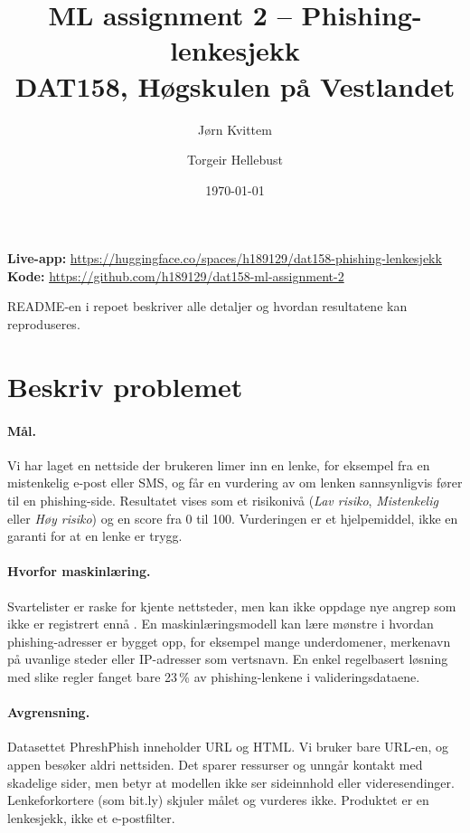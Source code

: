 \documentclass[11pt,a4paper]{article}
\title{ML assignment 2 -- Phishing-lenkesjekk\\[4pt]\large DAT158, Høgskulen på Vestlandet}
\author{Jørn Kvittem \and Torgeir Hellebust}
\date{\today}
\begin{document}
\maketitle

\noindent\textbf{Live-app:} \url{https://huggingface.co/spaces/h189129/dat158-phishing-lenkesjekk}\\
\textbf{Kode:} \url{https://github.com/h189129/dat158-ml-assignment-2}

\noindent README-en i repoet beskriver alle detaljer og hvordan resultatene kan reproduseres.

\section{Beskriv problemet}

\paragraph{Mål.} Vi har laget en nettside der brukeren limer inn en lenke, for eksempel fra en mistenkelig e-post eller SMS, og får en vurdering av om lenken sannsynligvis fører til en phishing-side. Resultatet vises som et risikonivå (\emph{Lav risiko}, \emph{Mistenkelig} eller \emph{Høy risiko}) og en score fra 0 til 100. Vurderingen er et hjelpemiddel, ikke en garanti for at en lenke er trygg.

\paragraph{Hvorfor maskinlæring.} Svartelister er raske for kjente nettsteder, men kan ikke oppdage nye angrep som ikke er registrert ennå \cite{phreshphish}. En maskinlæringsmodell kan lære mønstre i hvordan phishing-adresser er bygget opp, for eksempel mange underdomener, merkenavn på uvanlige steder eller IP-adresser som vertsnavn. En enkel regelbasert løsning med slike regler fanget bare 23\,\% av phishing-lenkene i valideringsdataene.

\paragraph{Avgrensning.} Datasettet PhreshPhish \cite{phreshphish,datasetcard} inneholder URL og HTML. Vi bruker bare URL-en, og appen besøker aldri nettsiden. Det sparer ressurser og unngår kontakt med skadelige sider, men betyr at modellen ikke ser sideinnhold eller videresendinger. Lenkeforkortere (som bit.ly) skjuler målet og vurderes ikke. Produktet er en lenkesjekk, ikke et e-postfilter.
\end{document}
